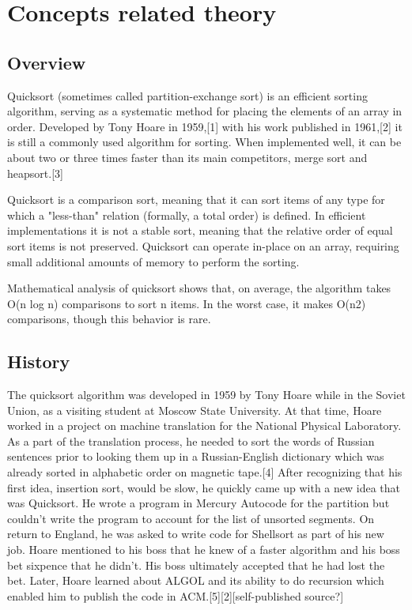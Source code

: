 \documentclass[10pt,a4paper]{article}
\begin{document}
\section{Concepts related theory}
\subsection{Overview}
Quicksort (sometimes called partition-exchange sort) is an efficient sorting algorithm, serving as a systematic method for placing the elements of an array in order. Developed by Tony Hoare in 1959,[1] with his work published in 1961,[2] it is still a commonly used algorithm for sorting. When implemented well, it can be about two or three times faster than its main competitors, merge sort and heapsort.[3]

Quicksort is a comparison sort, meaning that it can sort items of any type for which a "less-than" relation (formally, a total order) is defined. In efficient implementations it is not a stable sort, meaning that the relative order of equal sort items is not preserved. Quicksort can operate in-place on an array, requiring small additional amounts of memory to perform the sorting.

Mathematical analysis of quicksort shows that, on average, the algorithm takes O(n log n) comparisons to sort n items. In the worst case, it makes O(n2) comparisons, though this behavior is rare.

\subsection{History}
The quicksort algorithm was developed in 1959 by Tony Hoare while in the Soviet Union, as a visiting student at Moscow State University. At that time, Hoare worked in a project on machine translation for the National Physical Laboratory. As a part of the translation process, he needed to sort the words of Russian sentences prior to looking them up in a Russian-English dictionary which was already sorted in alphabetic order on magnetic tape.[4] After recognizing that his first idea, insertion sort, would be slow, he quickly came up with a new idea that was Quicksort. He wrote a program in Mercury Autocode for the partition but couldn't write the program to account for the list of unsorted segments. On return to England, he was asked to write code for Shellsort as part of his new job. Hoare mentioned to his boss that he knew of a faster algorithm and his boss bet sixpence that he didn't. His boss ultimately accepted that he had lost the bet. Later, Hoare learned about ALGOL and its ability to do recursion which enabled him to publish the code in ACM.[5][2][self-published source?]
\end{document}
